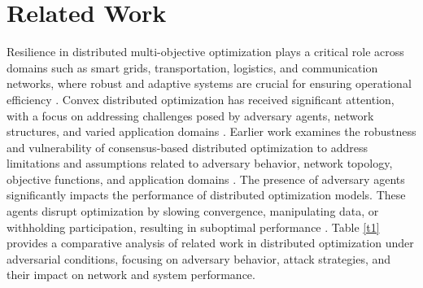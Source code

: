 \section{Related Work}
\label{sec2} 
Resilience in distributed multi-objective optimization plays a critical role across domains such as smart grids, transportation, logistics, and communication networks, where robust and adaptive systems are crucial for ensuring operational efficiency \cite{yazdani2023techno, qiao2023multi}. Convex distributed optimization has received significant attention, with a focus on addressing challenges posed by adversary agents, network structures, and varied application domains \cite{yang2019survey, fanitabasi2018review, patari2021distributed}. Earlier work examines the robustness and vulnerability of consensus-based distributed optimization to address limitations and assumptions related to adversary behavior, network topology, objective functions, and application domains \cite{fanitabasi2018review, fu2021resilient, zhang2023accelerated}. The presence of adversary agents significantly impacts the performance of distributed optimization models. These agents disrupt optimization by slowing convergence, manipulating data, or withholding participation, resulting in suboptimal performance \cite{gupta2020fault, gonzalez2018multi}. Table \ref{t1} provides a comparative analysis of related work in distributed optimization under adversarial conditions, focusing on adversary behavior, attack strategies, and their impact on network and system performance.

